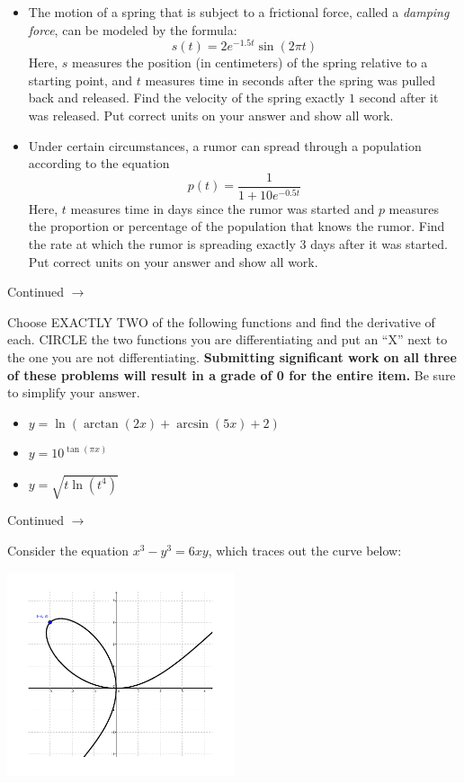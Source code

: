 \documentclass[addpoints]{exam}
\def\pageturn{\vfill
\begin{flushright}
	\begin{small}
		Continued $\rightarrow$
	\end{small}
\end{flushright}
\newpage}
\begin{document}
\begin{questions}
\begin{itemize}
	\item The motion of a spring that is subject to a frictional force, called a \emph{damping force}, can be modeled by the formula: 
	\[ s(t) = 2e^{-1.5t} \sin(2\pi t)\] 
Here, $s$ measures the position (in centimeters) of the spring relative to a starting point, and $t$ measures time in seconds after the spring was pulled back and released. Find the velocity of the spring exactly $1$ second after it was released. Put correct units on your answer and show all work. 

	\item Under certain circumstances, a rumor can spread through a population according to the equation
	\[ p(t) = \frac{1}{1 + 10e^{-0.5t}} \]
Here, $t$ measures time in days since the rumor was started and $p$ measures the proportion or percentage of the population that knows the rumor. Find the rate at which the rumor is spreading exactly 3 days after it was started.	Put correct units on your answer and show all work. 

\end{itemize}


\pageturn

\question[16] Choose EXACTLY TWO of the following functions and find the derivative of each. CIRCLE the two functions you are differentiating and put an ``X'' next to the one you are not differentiating. \textbf{Submitting significant work on all three of these problems will result in a grade of 0 for the entire item. } Be sure to simplify your answer.  

\begin{itemize}
	 \item $y = \ln(\arctan(2x) + \arcsin(5x) + 2)$
	\item $y = 10^{\tan(\pi x)}$ 
	\item $y = \sqrt{t \ln(t^4)}$  
\end{itemize}

\pageturn

\question Consider the equation $x^3 - y^3 = 6xy$, which traces out the curve below: 
\begin{center}
	\includegraphics[width=0.5\textwidth]{a2-implicitplot2}
\end{center}


\end{questions}
\end{document}

